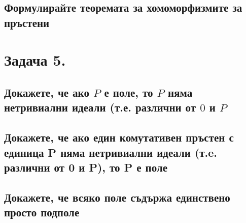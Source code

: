\documentclass[10pt]{article}
\begin{document}
\subsection*{Формулирайте теоремата за хомоморфизмите за пръстени}

\section*{Задача 5.}
\subsection*{Докажете, че ако $P$ е поле, то $P$ няма нетривиални идеали (т.е. различни от ${0}$ и $P$}
\subsection*{Докажете, че ако един комутативен пръстен с единица P няма нетривиални идеали (т.e. различни от {0} и P), то P е поле}
\subsection*{Докажете, че всяко поле съдържа единствено просто подполе}
\end{document}
